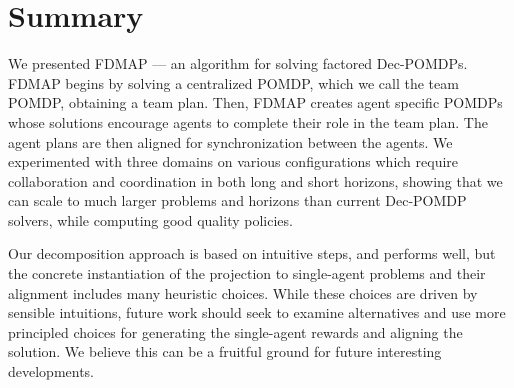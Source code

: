 \documentclass[letterpaper]{article}
\theoremstyle{definition}
\begin{document}
\section{Summary}
We presented FDMAP --- an algorithm for solving factored Dec-POMDPs. FDMAP begins by solving a centralized POMDP, which we call the team POMDP, obtaining a team plan. Then, FDMAP creates agent specific POMDPs whose solutions encourage agents to complete their role in the team plan. The agent plans are then aligned for synchronization between the agents. We experimented with three domains on various configurations which require collaboration and coordination in both long and short horizons, showing that we can scale to much larger problems and horizons than current Dec-POMDP solvers, while computing good quality policies. 

Our decomposition approach is based on intuitive steps,
and performs well, but the concrete instantiation of the projection to single-agent problems and their alignment includes many heuristic choices. While these choices are driven by sensible intuitions, future work should seek to examine alternatives and use more principled choices for generating the single-agent rewards and aligning the solution. We believe this can be a fruitful ground for future interesting developments.
\end{document}
